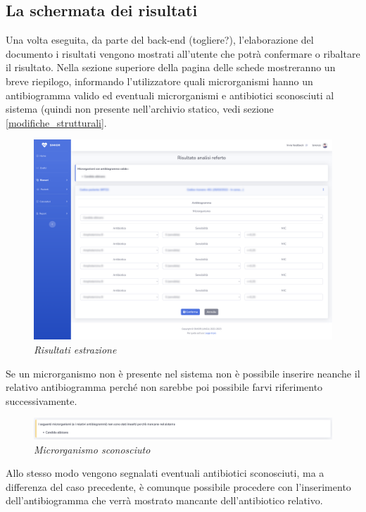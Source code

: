\subsection{La schermata dei risultati}
Una volta eseguita, da parte del back-end (togliere?), l'elaborazione del documento i risultati vengono mostrati all'utente che potrà confermare o ribaltare il risultato. 
Nella sezione superiore della pagina delle schede mostreranno un breve riepilogo, informando l'utilizzatore quali microrganismi hanno un antibiogramma valido ed eventuali microrganismi e antibiotici sconosciuti al sistema (quindi non presente nell'archivio statico, vedi sezione \ref{modifiche_strutturali}.
\begin{figure}[h!]
	\centering
	\includegraphics[width=.99\columnwidth]{images/extraction_result.png}
	\caption{\textit{Risultati estrazione}}
	\label{fig:extraction_result}
\end{figure}
\newline
Se un microrganismo non è presente nel sistema non è possibile inserire neanche il relativo antibiogramma perché non sarebbe poi possibile farvi riferimento successivamente.
\begin{figure}[h!]
	\centering
	\includegraphics[width=.99\columnwidth]{images/static_missing.png}
	\caption{\textit{Microrganismo sconosciuto}}
	\label{fig:missing_micro}
\end{figure}
\newline
Allo stesso modo vengono segnalati eventuali antibiotici sconosciuti, ma a differenza del caso precedente, è comunque possibile procedere con l'inserimento dell'antibiogramma che verrà mostrato mancante dell'antibiotico relativo.
